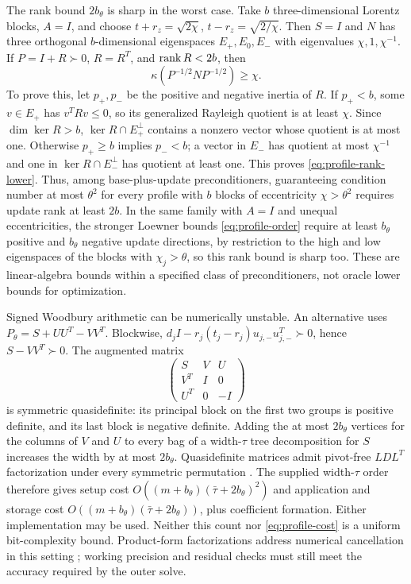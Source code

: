 The rank bound $2b_\theta$ is sharp in the worst case. Take $b$
three-dimensional Lorentz blocks, $A=I$, and choose
$t+r_z=\sqrt{2\chi}$, $t-r_z=\sqrt{2/\chi}$. Then $S=I$ and $N$ has
three orthogonal $b$-dimensional eigenspaces $E_+,E_0,E_-$ with eigenvalues
$\chi,1,\chi^{-1}$. If $P=I+R\succ0$, $R=R^T$, and $\operatorname{rank} R<2b$,
then
\begin{equation}\label{eq:profile-rank-lower}
                  \kappa(P^{-1/2}NP^{-1/2})\geq\chi.
\end{equation}
To prove this, let $p_+,p_-$ be the positive and negative inertia of $R$.
If $p_+<b$, some $v\in E_+$ has $v^TRv\leq0$, so its generalized
Rayleigh quotient is at least $\chi$. Since $\dim\ker R>b$,
$\ker R\cap E_+^\perp$ contains a nonzero vector whose quotient is at
most one. Otherwise $p_+\geq b$ implies $p_-<b$; a vector in $E_-$ has
quotient at most $\chi^{-1}$ and one in $\ker R\cap E_-^\perp$ has
quotient at least one. This proves \eqref{eq:profile-rank-lower}.
Thus, among base-plus-update preconditioners, guaranteeing condition
number at most $\theta^2$ for every profile with $b$ blocks of
eccentricity $\chi>\theta^2$ requires update rank at least $2b$. In the
same family with $A=I$ and unequal eccentricities, the stronger Loewner
bounds \eqref{eq:profile-order} require at least $b_\theta$ positive and
$b_\theta$ negative update directions, by restriction to the high and low
eigenspaces of the blocks with $\chi_j>\theta$, so this rank bound is
sharp too. These are linear-algebra
bounds within a specified class of preconditioners, not oracle lower
bounds for optimization.

Signed Woodbury arithmetic can be numerically unstable. An alternative
uses $P_\theta=S+UU^T-VV^T$. Blockwise,
$d_jI-r_j(t_j-r_j)u_{j,-}u_{j,-}^T\succ0$, hence $S-VV^T\succ0$.
The augmented matrix
\[
 \begin{pmatrix}S&V&U\\V^T&I&0\\U^T&0&-I\end{pmatrix}
\]
is symmetric quasidefinite: its principal block on the first two
groups is positive definite, and its last block is negative definite.
Adding the at most $2b_\theta$ vertices for the columns of $V$ and $U$ to
every bag of a width-$\tau$ tree decomposition for $S$ increases the width
by at most $2b_\theta$. Quasidefinite matrices admit pivot-free
$LDL^T$ factorization under every symmetric permutation
\citep{Vanderbei1995}. The supplied width-$\tau$ order therefore gives
setup cost $O((m+b_\theta)(\bar\tau+2b_\theta)^2)$ and application and
storage cost $O((m+b_\theta)(\bar\tau+2b_\theta))$, plus coefficient
formation. Either implementation may be used.
Neither this count nor \eqref{eq:profile-cost} is a uniform
bit-complexity bound. Product-form factorizations address numerical
cancellation in this setting \citep{GoldfarbScheinberg2005}; working
precision and residual checks must still meet the accuracy required by
the outer solve.

